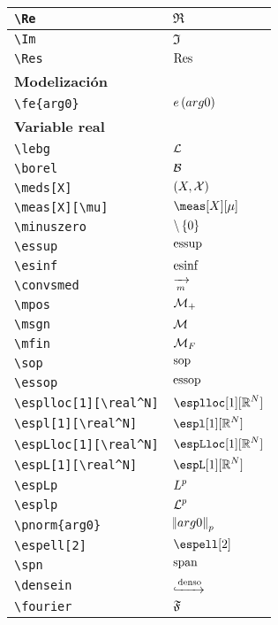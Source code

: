 \begin{longtable}{|p{3.5cm}|p{2cm}|}
\verb|\Re| & $\displaystyle\Re$ \\ \midrule 
\verb|\Im| & $\displaystyle\Im$ \\ \midrule 
\verb|\Res| & $\displaystyle\Res$ \\ \midrule 
\bottomrule \multicolumn{2}{|p{5.5cm}|}{\textbf{Modelización}} \\ \toprule 
\verb|\fe{arg0}| & $\displaystyle\fe{arg0}$ \\ \midrule 
\bottomrule \multicolumn{2}{|p{5.5cm}|}{\textbf{Variable real}} \\ \toprule 
\verb|\lebg| & $\displaystyle\lebg$ \\ \midrule 
\verb|\borel| & $\displaystyle\borel$ \\ \midrule 
\verb|\meds[X]| & $\displaystyle\meds[X]$ \\ \midrule 
\verb|\meas[X][\mu]| & $\displaystyle\meas[X][\mu]$ \\ \midrule 
\verb|\minuszero| & $\displaystyle\minuszero$ \\ \midrule 
\verb|\essup| & $\displaystyle\essup$ \\ \midrule 
\verb|\esinf| & $\displaystyle\esinf$ \\ \midrule 
\verb|\convsmed| & $\displaystyle\convsmed$ \\ \midrule 
\verb|\mpos| & $\displaystyle\mpos$ \\ \midrule 
\verb|\msgn| & $\displaystyle\msgn$ \\ \midrule 
\verb|\mfin| & $\displaystyle\mfin$ \\ \midrule 
\verb|\sop| & $\displaystyle\sop$ \\ \midrule 
\verb|\essop| & $\displaystyle\essop$ \\ \midrule 
\verb|\esplloc[1][\real^N]| & $\displaystyle\esplloc[1][\real^N]$ \\ \midrule 
\verb|\espl[1][\real^N]| & $\displaystyle\espl[1][\real^N]$ \\ \midrule 
\verb|\espLloc[1][\real^N]| & $\displaystyle\espLloc[1][\real^N]$ \\ \midrule 
\verb|\espL[1][\real^N]| & $\displaystyle\espL[1][\real^N]$ \\ \midrule 
\verb|\espLp| & $\displaystyle\espLp$ \\ \midrule 
\verb|\esplp| & $\displaystyle\esplp$ \\ \midrule 
\verb|\pnorm{arg0}| & $\displaystyle\pnorm{arg0}$ \\ \midrule 
\verb|\espell[2]| & $\displaystyle\espell[2]$ \\ \midrule 
\verb|\spn| & $\displaystyle\spn$ \\ \midrule 
\verb|\densein| & $\displaystyle\densein$ \\ \midrule 
\verb|\fourier| & $\displaystyle\fourier$ \\ \midrule 
\end{longtable}